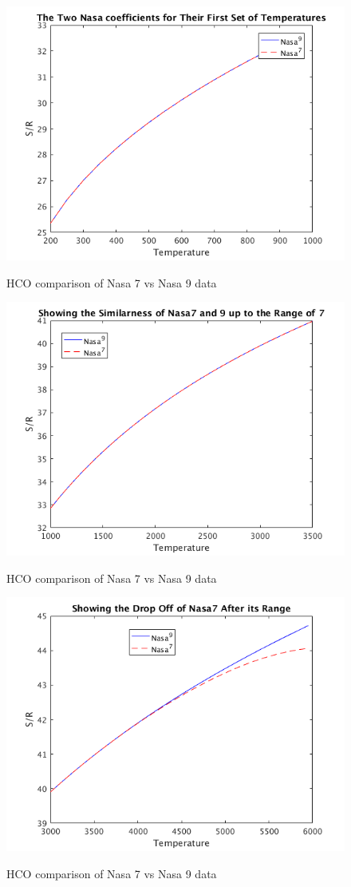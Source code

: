 \documentclass{article}
\begin{document}
\begin{figure}
  \centering
  \includegraphics[width=.8\linewidth]{./NasaPlots/S1.png}
  \label{fig:s1}
  \caption{HCO comparison of Nasa 7 vs Nasa 9 data}
\end{figure}


\begin{figure}
  \centering
  \includegraphics[width=.8\linewidth]{./NasaPlots/S2.png}
  \label{fig:S2}
  \caption{HCO comparison of Nasa 7 vs Nasa 9 data}
\end{figure}


\begin{figure}
  \centering
  \includegraphics[width=.8\linewidth]{./NasaPlots/S3.png}
  \label{fig:S3}
  \caption{HCO comparison of Nasa 7 vs Nasa 9 data}
\end{figure}
\end{document}
